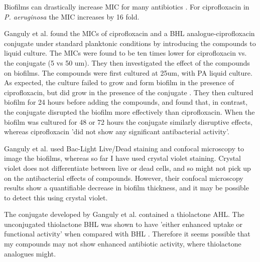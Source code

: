 %

Biofilms can drastically increase MIC for many antibiotics \cite{Ceri1999}. For ciprofloxacin in \textit{P. aeruginosa} the MIC increases by 16 fold. 

Ganguly et al. \cite{Ganguly2011} found the MICs of ciprofloxacin and a BHL analogue-ciprofloxacin  conjugate under standard planktonic conditions by introducing the compounds to liquid culture. The MICs were found to be ten times lower for ciprofloxacin vs. the conjugate  (5 vs 50 um). They then investigated the effect of the compounds on biofilms. The compounds were first cultured at 25um, with PA liquid culture. As expected, the culture failed to grow and form biofilm in the presence of ciprofloxacin, but did grow in the presence of the conjugate . They then cultured biofilm for 24 hours before adding the compounds, and found that, in contrast, the conjugate  disrupted the biofilm more effectively than ciprofloxacin. When the biofilm was cultured for 48 or 72 hours the conjugate similarly disruptive effects, whereas ciprofloxacin 'did not show any significant antibacterial activity'.

Ganguly et al. used Bac-Light Live/Dead staining and confocal microscopy to image the biofilms, whereas so far I have used crystal violet staining. Crystal violet does not differentiate between live or dead cells, and so might not pick up on the antibacterial effects of compounds. However, their confocal microscopy results show a quantifiable decrease in biofilm thickness, and it may be possible to detect this using crystal violet.

The conjugate  developed by Ganguly et al. contained a thiolactone AHL. The unconjugated thiolactone BHL  was shown to have 'either enhanced uptake or functional activity' when compared with BHL . Therefore it seems possible that my compounds may not show enhanced antibiotic activity, where thiolactone analogues might.